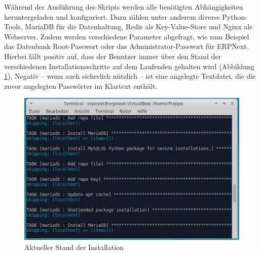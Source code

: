 Während der Ausführung des Skripts werden alle benötigten Abhängigkeiten heruntergeladen und konfiguriert. Dazu zählen unter anderem diverse Python-Tools, MariaDB für die Datenhaltung, Redis als Key-Value-Store und Nginx als Webserver. Zudem werden verschiedene Parameter abgefragt, wie zum Beispiel das Datenbank Root-Passwort oder das Administrator-Passwort für ERPNext. Hierbei fällt positiv auf, dass der Benutzer immer über den Stand der verschiedenen Installationsschritte auf dem Laufenden gehalten wird (\vgl Abbildung \ref{fig:aktInst}). Negativ – wenn auch sicherlich nützlich – ist eine angelegte Textdatei, die die zuvor angelegten Passwörter im Klartext enthält.
\begin{figure}[H]
  \centering
  \includegraphics[width=\textwidth]{Bilder/Aktueller_Stand_Installation.PNG}
  \caption{Aktueller Stand der Installation}
  \label{fig:aktInst}
\end{figure}

